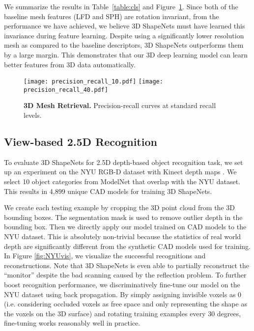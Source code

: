 \documentclass[10pt,twocolumn,letterpaper]{article}
\begin{document}
We summarize the results in Table~\ref{table:cls} and Figure~\ref{fig:feature}. 
Since both of the baseline mesh features (LFD and SPH) are rotation invariant, from the performance we have achieved, we believe 3D ShapeNets must have learned this invariance during feature learning. Despite using a significantly lower resolution mesh as compared to the baseline descriptors, 3D ShapeNets outperforms them by a large margin. 
This demonstrates that our 3D deep learning model can learn better features from 3D data automatically.



\begin{figure}[t]
\centering
\texttt{[image: precision\_recall\_10.pdf]} \quad
\texttt{[image: precision\_recall\_40.pdf]}




\vspace{-2mm}
\caption{{\bf 3D Mesh Retrieval.} Precision-recall curves at standard recall levels.}
\label{fig:feature}
\end{figure}

\subsection{View-based 2.5D Recognition}




To evaluate 3D ShapeNets for 2.5D depth-based object recognition task, 
we set up an experiment on the NYU RGB-D dataset with Kinect depth maps \cite{NYUdataset}.
We select 10 object categories from ModelNet that overlap with the NYU dataset. This results in 4,899 unique CAD models for training 3D ShapeNets. 

We create each testing example by cropping the 3D point cloud from the 3D bounding boxes. 
The segmentation mask is used to remove outlier depth in the bounding box.
Then we directly apply our model trained on CAD models to the NYU dataset. This is absolutely non-trivial because the statistics of real world depth are significantly different from the synthetic CAD models used for training. In Figure \ref{fig:NYUvis}, we visualize the successful recognitions and reconstructions. Note that 3D ShapeNets is even able to partially reconstruct the ``monitor'' despite the bad scanning caused by the reflection problem. To further boost recognition performance, we discriminatively fine-tune our model on the NYU dataset
using back propagation. 
By simply assigning invisible voxels as 0 (i.e. considering occluded voxels as free space and only representing the shape as the voxels on the 3D surface) and rotating training examples every 30 degrees, fine-tuning works reasonably well in practice.
\end{document}
